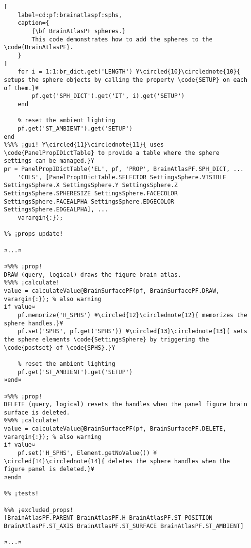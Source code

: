 \documentclass{tufte-handout}
\begin{document}
\begin{lstlisting}[
	label=cd:pf:brainatlaspf:sphs,
	caption={
		{\bf BrainAtlasPF spheres.}
		This code demonstrates how to add the spheres to the \code{BrainAtlasPF}.
	}
]
    for i = 1:1:br_dict.get('LENGTH') ¥\circled{10}\circlednote{10}{ setups the sphere objects by calling the property \code{SETUP} on each of them.}¥
        pf.get('SPH_DICT').get('IT', i).get('SETUP')
    end
    
    % reset the ambient lighting
    pf.get('ST_AMBIENT').get('SETUP')
end
%%%% ¡gui! ¥\circled{11}\circlednote{11}{ uses \code{PanelPropIDictTable} to provide a table where the sphere settings can be managed.}¥
pr = PanelPropIDictTable('EL', pf, 'PROP', BrainAtlasPF.SPH_DICT, ...
    'COLS', [PanelPropIDictTable.SELECTOR SettingsSphere.VISIBLE SettingsSphere.X SettingsSphere.Y SettingsSphere.Z SettingsSphere.SPHERESIZE SettingsSphere.FACECOLOR SettingsSphere.FACEALPHA SettingsSphere.EDGECOLOR SettingsSphere.EDGEALPHA], ...
    varargin{:});

%% ¡props_update!

¤...¤

¤%%% ¡prop!
DRAW (query, logical) draws the figure brain atlas.
%%%% ¡calculate!
value = calculateValue@BrainSurfacePF(pf, BrainSurfacePF.DRAW, varargin{:}); % also warning
if value¤
    pf.memorize('H_SPHS') ¥\circled{12}\circlednote{12}{ memorizes the sphere handles.}¥
    pf.set('SPHS', pf.get('SPHS')) ¥\circled{13}\circlednote{13}{ sets the sphere elements \code{SettingsSphere} by triggering the \code{postset} of \code{SPHS}.}¥

    % reset the ambient lighting
    pf.get('ST_AMBIENT').get('SETUP')
¤end¤
    
¤%%% ¡prop!
DELETE (query, logical) resets the handles when the panel figure brain surface is deleted.
%%%% ¡calculate!
value = calculateValue@BrainSurfacePF(pf, BrainSurfacePF.DELETE, varargin{:}); % also warning
if value¤
    pf.set('H_SPHS', Element.getNoValue()) ¥\circled{14}\circlednote{14}{ deletes the sphere handles when the figure panel is deleted.}¥
¤end¤

%% ¡tests!

%%% ¡excluded_props!
[BrainAtlasPF.PARENT BrainAtlasPF.H BrainAtlasPF.ST_POSITION BrainAtlasPF.ST_AXIS BrainAtlasPF.ST_SURFACE BrainAtlasPF.ST_AMBIENT]

¤...¤
\end{lstlisting}
\end{document}
